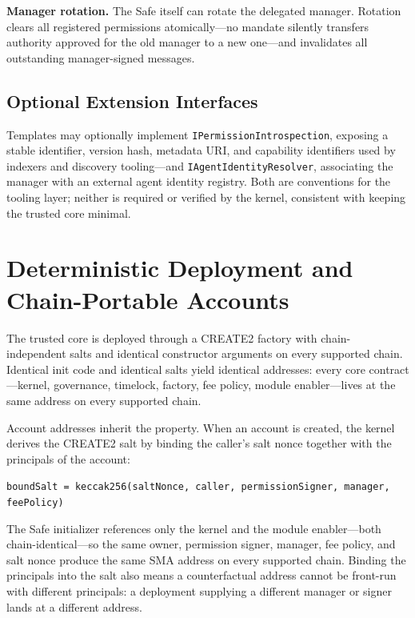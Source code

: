 \documentclass[11pt]{article}
\begin{document}
\textbf{Manager rotation.} The Safe itself can rotate the delegated manager. Rotation clears all registered permissions atomically---no mandate silently transfers authority approved for the old manager to a new one---and invalidates all outstanding manager-signed messages.

\subsection{Optional Extension Interfaces}

Templates may optionally implement \texttt{IPermissionIntrospection}, exposing a stable identifier, version hash, metadata URI, and capability identifiers used by indexers and discovery tooling---and \texttt{IAgentIdentityResolver}, associating the manager with an external agent identity registry. Both are conventions for the tooling layer; neither is required or verified by the kernel, consistent with keeping the trusted core minimal.

\section{Deterministic Deployment and Chain-Portable Accounts}
\label{sec:deployment}

The trusted core is deployed through a CREATE2 factory with chain-independent salts and identical constructor arguments on every supported chain. Identical init code and identical salts yield identical addresses: every core contract---kernel, governance, timelock, factory, fee policy, module enabler---lives at the same address on every supported chain.

Account addresses inherit the property. When an account is created, the kernel derives the CREATE2 salt by binding the caller's salt nonce together with the principals of the account:
\begin{center}
\small\texttt{boundSalt = keccak256(saltNonce, caller, permissionSigner, manager, feePolicy)}
\end{center}
The Safe initializer references only the kernel and the module enabler---both chain-identical---so the same owner, permission signer, manager, fee policy, and salt nonce produce the same SMA address on every supported chain. Binding the principals into the salt also means a counterfactual address cannot be front-run with different principals: a deployment supplying a different manager or signer lands at a different address.
\end{document}
